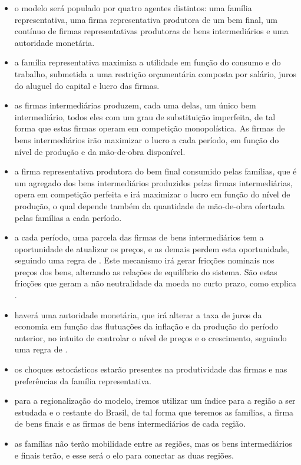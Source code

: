 \documentclass[12pt]{article}
\numberwithin{equation}{section}
\theoremstyle{definition}
\begin{document}
\begin{itemize}
	\item o modelo será populado por quatro agentes distintos: uma família representativa, uma firma representativa produtora de um bem final, um contínuo de firmas representativas produtoras de bens intermediários e uma autoridade monetária.
	\item a família representativa maximiza a utilidade em função do consumo e do trabalho, submetida a uma restrição orçamentária composta por salário, juros do aluguel do capital e lucro das firmas.
	\item as firmas intermediárias produzem, cada uma delas, um único bem intermediário, todos eles com um grau de substituição imperfeita, de tal forma que estas firmas operam em competição monopolística. As firmas de bens intermediários irão maximizar o lucro a cada período, em função do nível de produção e da mão-de-obra disponível.
	\item a firma representativa produtora do bem final consumido pelas famílias, que é um agregado dos bens intermediários produzidos pelas firmas intermediárias, opera em competição perfeita e irá maximizar o lucro em função do nível de produção, o qual depende também da quantidade de mão-de-obra ofertada pelas famílias a cada período.
	\item a cada período, uma parcela das firmas de bens intermediários tem a oportunidade de atualizar os preços, e as demais perdem esta oportunidade, seguindo uma regra de \textcite{calvo_staggered_1983}. Este mecanismo irá gerar fricções nominais nos preços dos bens, alterando as relações de equilíbrio do sistema. São estas fricções que geram a não neutralidade da moeda no curto prazo, como explica \textcite[p.191]{costa_junior_understanding_2016}.
	\item haverá uma autoridade monetária, que irá alterar a taxa de juros da economia em função das flutuações da inflação e da produção do período anterior, no intuito de controlar o nível de preços e o crescimento, seguindo uma regra de \textcite{taylor_discretion_1993}.
	\item os choques estocásticos estarão presentes na produtividade das firmas e nas preferências da família representativa.
	\item para a regionalização do modelo, iremos utilizar um índice para a região a ser estudada e o restante do Brasil, de tal forma que teremos as famílias, a firma de bens finais e as firmas de bens intermediários de cada região.
	\item as famílias não terão mobilidade entre as regiões, mas os bens intermediários e finais terão, e esse será o elo para conectar as duas regiões.
\end{itemize}
\end{document}
